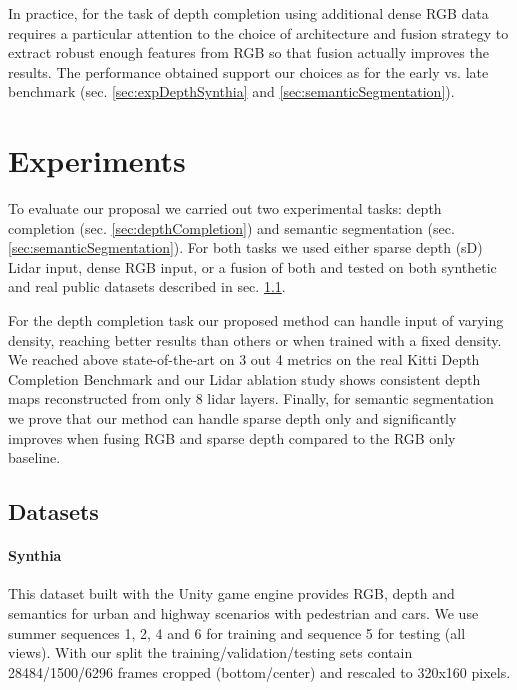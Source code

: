 \documentclass[10pt,twocolumn,letterpaper]{article}
\begin{document}
In practice, for the task of depth completion using additional dense RGB data requires a particular attention to the choice of architecture and fusion strategy to extract robust enough features from RGB so that fusion actually improves the results. The performance obtained support our choices as for the early vs. late benchmark (sec. \ref{sec:expDepthSynthia} and \ref{sec:semanticSegmentation}).





\section{Experiments}
\label{sec:experiments}

To evaluate our proposal we carried out two experimental tasks: depth completion (sec. \ref{sec:depthCompletion}) and semantic segmentation (sec. \ref{sec:semanticSegmentation}). For both tasks we used either sparse depth (sD) Lidar input, dense RGB input, or a fusion of both and tested on both synthetic and real public datasets described in sec. \ref{sec:datasets}.

For the depth completion task our proposed method can handle input of varying density, reaching better results than others or when trained with a fixed density.
We reached above state-of-the-art on 3 out 4 metrics on the real Kitti Depth Completion Benchmark and our Lidar ablation study shows consistent depth maps reconstructed from only 8 lidar layers.
Finally, for semantic segmentation we prove that our method can handle sparse depth only and significantly improves when fusing RGB and sparse depth compared to the RGB only baseline.

\subsection{Datasets}
\label{sec:datasets}

\paragraph{Synthia}
This dataset built with the Unity game engine provides RGB, depth and semantics for urban and highway scenarios \cite{Ros_2016_CVPR} with pedestrian and cars. 
We use summer sequences 1, 2, 4 and 6 for training and sequence 5 for testing (all views). With our split the training/validation/testing sets contain 28484/1500/6296 frames cropped (bottom/center) and rescaled to 320x160 pixels.
\end{document}
